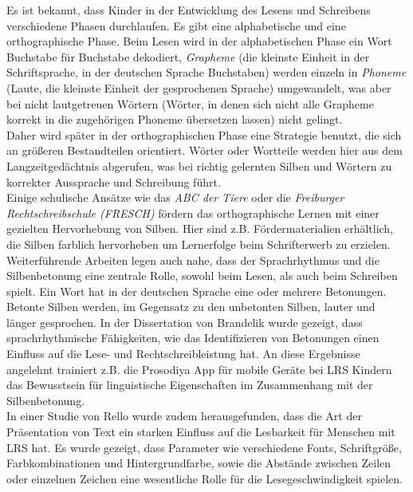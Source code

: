 Es ist bekannt, dass Kinder in der Entwicklung des Lesens und Schreibens verschiedene Phasen durchlaufen\cite{Steinbrink2014}. Es gibt eine alphabetische und eine orthographische Phase. Beim Lesen wird in der alphabetischen Phase ein Wort Buchstabe für Buchstabe dekodiert, \textit{Grapheme} (die kleinste Einheit in der Schriftsprache, in der deutschen Sprache Buchstaben) werden einzeln in \textit{Phoneme} (Laute, die kleinste Einheit der gesprochenen Sprache) umgewandelt, was aber bei nicht lautgetreuen Wörtern (Wörter, in denen sich nicht alle Grapheme korrekt in die zugehörigen Phoneme übersetzen lassen) nicht gelingt.\\
Daher wird später in der orthographischen Phase eine Strategie benutzt, die sich an größeren Bestandteilen orientiert. Wörter oder Wortteile werden hier aus dem Langzeitgedächtnis abgerufen, was bei richtig gelernten Silben und Wörtern zu korrekter Aussprache und Schreibung führt.\\
Einige schulische Ansätze wie das \textit{ABC der Tiere}\cite{mildenberger2013} oder die \textit{Freiburger Rechtschreibschule (FRESCH)}\cite{Fresch2016} fördern das orthographische Lernen mit einer gezielten Hervorhebung von Silben. Hier sind z.B. Fördermaterialien erhältlich, die Silben farblich hervorheben um Lernerfolge beim Schrifterwerb zu erzielen.\\

Weiterführende Arbeiten legen auch nahe, dass der Sprachrhythmus und die Silbenbetonung eine zentrale Rolle, sowohl beim Lesen, als auch beim Schreiben spielt. Ein Wort hat in der deutschen Sprache eine oder mehrere Betonungen. Betonte Silben werden, im Gegensatz zu den unbetonten Silben, lauter und länger gesprochen. In der Dissertation von Brandelik\cite{Brandelik2014} wurde gezeigt, dass sprachrhythmische Fähigkeiten, wie das Identifizieren von Betonungen einen Einfluss auf die Lese- und Rechtschreibleistung hat. An diese Ergebnisse angelehnt trainiert z.B. die Prosodiya App\cite{Holz2017} für mobile Geräte bei LRS Kindern das Bewusstsein für linguistische Eigenschaften im Zusammenhang mit der Silbenbetonung.\\
In einer Studie von Rello\cite{Rello:2017:PMR:3057333.3057414} wurde zudem herausgefunden, dass die Art der Präsentation von Text ein starken Einfluss auf die Lesbarkeit für Menschen mit LRS hat. Es wurde gezeigt, dass Parameter wie verschiedene Fonts, Schriftgröße, Farbkombinationen und Hintergrundfarbe, sowie die Abstände zwischen Zeilen oder einzelnen Zeichen eine wesentliche Rolle für die Lesegeschwindigkeit spielen.

